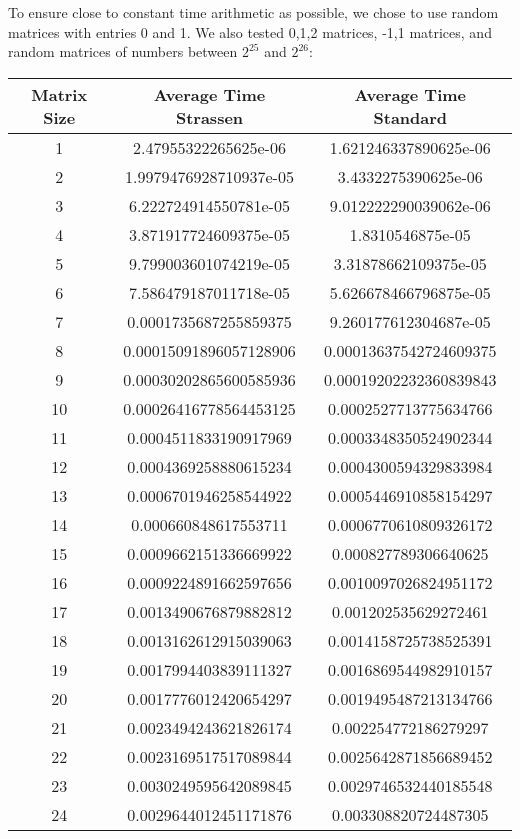\documentclass[11pt]{scrartcl}
\theoremstyle{dotlessP}
\theoremstyle{dotlessN}
\theoremstyle{dotN}
\begin{document}
To ensure close to constant time arithmetic as possible, we chose to use random matrices with entries 0 and 1.
We also tested 0,1,2 matrices, -1,1 matrices, and random matrices of numbers between $2^{25}$ and $2^{26}$:
\begin{tabular}{c|c|c}
Matrix Size & Average Time Strassen & Average Time Standard \\
\hline
1 & 2.47955322265625e-06 & 1.621246337890625e-06 \\
2 & 1.9979476928710937e-05 & 3.4332275390625e-06 \\
3 & 6.222724914550781e-05 & 9.012222290039062e-06 \\
4 & 3.871917724609375e-05 & 1.8310546875e-05 \\
5 & 9.799003601074219e-05 & 3.31878662109375e-05 \\
6 & 7.586479187011718e-05 & 5.626678466796875e-05 \\
7 & 0.0001735687255859375 & 9.260177612304687e-05 \\
8 & 0.00015091896057128906 & 0.00013637542724609375 \\
9 & 0.00030202865600585936 & 0.00019202232360839843 \\
10 & 0.00026416778564453125 & 0.0002527713775634766 \\
11 & 0.0004511833190917969 & 0.0003348350524902344 \\
12 & 0.0004369258880615234 & 0.0004300594329833984 \\
13 & 0.0006701946258544922 & 0.0005446910858154297 \\
14 & 0.000660848617553711 & 0.0006770610809326172 \\
15 & 0.0009662151336669922 & 0.000827789306640625 \\
16 & 0.0009224891662597656 & 0.0010097026824951172 \\
17 & 0.0013490676879882812 & 0.001202535629272461 \\
18 & 0.0013162612915039063 & 0.0014158725738525391 \\
19 & 0.0017994403839111327 & 0.0016869544982910157 \\
20 & 0.0017776012420654297 & 0.0019495487213134766 \\
21 & 0.0023494243621826174 & 0.002254772186279297 \\
22 & 0.0023169517517089844 & 0.0025642871856689452 \\
23 & 0.0030249595642089845 & 0.0029746532440185548 \\
24 & 0.0029644012451171876 & 0.003308820724487305 \\

\end{tabular}
\end{document}
